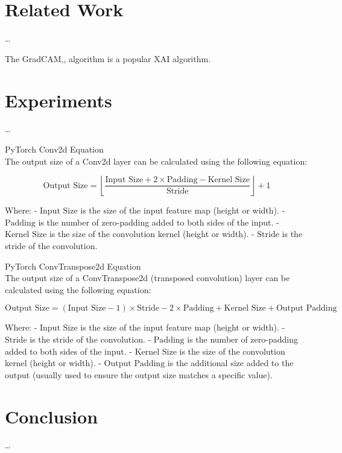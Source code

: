 \documentclass[12pt]{article}
\begin{document}
\section{Related Work}
\ldots

The GradCAM,\cite{selvarajuGradCAMVisualExplanations2020}, algorithm is a popular XAI algorithm. 
\section{Experiments}
\ldots

PyTorch Conv2d Equation \\

The output size of a Conv2d layer can be calculated using the following equation:

\[ \text{Output Size} = \left\lfloor \frac{\text{Input Size} + 2 \times \text{Padding} - \text{Kernel Size}}{\text{Stride}} \right\rfloor + 1 \]

Where:
- \(\text{Input Size}\) is the size of the input feature map (height or width).
- \(\text{Padding}\) is the number of zero-padding added to both sides of the input.
- \(\text{Kernel Size}\) is the size of the convolution kernel (height or width).
- \(\text{Stride}\) is the stride of the convolution.

PyTorch ConvTranspose2d Equation\\

The output size of a ConvTranspose2d (transposed convolution) layer can be calculated using the following equation:

\[ \text{Output Size} = (\text{Input Size} - 1) \times \text{Stride} - 2 \times \text{Padding} + \text{Kernel Size} + \text{Output Padding} \]

Where:
- \(\text{Input Size}\) is the size of the input feature map (height or width).
- \(\text{Stride}\) is the stride of the convolution.
- \(\text{Padding}\) is the number of zero-padding added to both sides of the input.
- \(\text{Kernel Size}\) is the size of the convolution kernel (height or width).
- \(\text{Output Padding}\) is the additional size added to the output (usually used to ensure the output size matches a specific value).

\section{Conclusion}
\ldots

\newpage
\begin{footnotesize} %
\singlespacing %
\setlength{\bibsep}{5pt} %
\thispagestyle{empty} %
\end{footnotesize} %
\end{document}
